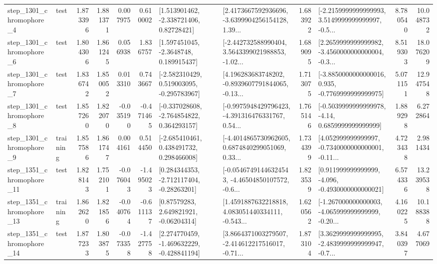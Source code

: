 \begin{tabular}{llrrrrllrlrr}
  step\_1301\_chromophore\_4 &      test &      1.873396 &    1.881371 &      0.007975 &  0.610002 &     [1.513901462, -2.338721406, 0.82728421] &  [2.4173667592936696, -3.6399904256154128, 1.39... &       1.683922 &  [-2.2159999999999993, 3.5149999999999997, -0.5... &            8.780540 &         10.048732 \\
  step\_1301\_chromophore\_6 &      test &      1.804306 &    1.861245 &      0.056938 &  1.836757 &      [1.597451045, -2.3648748, 0.189915437] &  [-2.442732588990404, 3.5643399021988853, -1.02... &       1.689095 &  [2.2659999999999982, -3.4560000000000004, -0.3... &            8.519303 &         18.076209 \\
  step\_1301\_chromophore\_7 &      test &      1.836742 &    1.850052 &      0.013310 &  0.743667 &   [-2.582310429, 0.519003095, -0.295783967] &  [4.196283683748202, -0.8939607791844065, -0.13... &       1.713075 &  [-3.8850000000000016, 0.935, -0.7769999999999975] &            5.071151 &         12.947548 \\
  step\_1301\_chromophore\_8 &      test &      1.857260 &    1.822070 &     -0.035190 & -0.471465 &   [-0.337028608, -2.764854822, 0.364293157] &  [-0.9975948429796423, -4.391316476331767, 0.54... &       1.765146 &   [-0.5039999999999978, -4.14, 0.6859999999999999] &            1.889298 &          6.272864 \\
  step\_1301\_chromophore\_9 &  training &      1.857586 &    1.861747 &      0.004161 &  0.514450 &    [-2.685410461, 0.438491732, 0.298466008] &  [-4.4014865730962605, 0.6874840299051069, 0.33... &       1.734399 &  [4.052999999999997, -0.7340000000000001, -0.11... &            4.723438 &          2.981434 \\
 step\_1351\_chromophore\_11 &      test &      1.828143 &    1.752101 &     -0.076043 & -1.495023 &    [0.284344353, -2.712117404, -0.28263201] &  [-0.05467491446324543, -4.46504850107572, -0.6... &       1.823539 &   [0.911999999999999, -4.096, -0.4930000000000021] &            6.574336 &         13.239538 \\
 step\_1351\_chromophore\_13 &  training &      1.862620 &    1.821856 &     -0.040764 & -0.611137 &      [0.87579283, 2.649821921, -0.06204314] &  [1.4591887632218818, 4.083051440334111, -0.543... &       1.620562 &  [-1.267000000000003, -4.065999999999999, -0.20... &            4.160225 &         10.188388 \\
 step\_1351\_chromophore\_14 &      test &      1.877233 &    1.803875 &     -0.073358 & -1.427758 &   [2.274770459, -1.469632229, -0.428841194] &  [3.8664371003279507, -2.414612217516017, -0.71... &       1.873104 &  [3.3629999999999995, -2.4839999999999947, -0.7... &            3.840397 &          4.677069 \\

\end{tabular}
